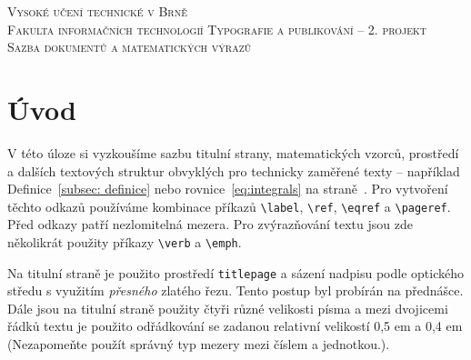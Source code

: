 \documentclass[twocolumn,a4paper,11pt]{article}
\begin{document}
\begin{center}
    \Huge
    \textsc{Vysoké učení technické v Brně \\ Fakulta informačních technologií}
    \textsc{Typografie a publikování -- 2. projekt \\ Sazba dokumentů a matematických výrazů}
\end{center}

{\date{2023} \hfill \author{Roland Schulz (xschul06)} }
\thispagestyle{empty}
\newpage

\section{Úvod}
\label{sec:intro}
V této úloze si vyzkoušíme sazbu titulní strany, matematických vzorců, prostředí a dalších textových struktur obvyklých pro technicky zaměřené texty -- například Definice~\ref{subsec: definice} nebo rovnice~\eqref{eq:integrals} na straně~\pageref{sec: rovnice}. Pro vytvoření těchto odkazů používáme kombinace příkazů \verb|\label|, \verb|\ref|, \verb|\eqref| a \verb|\pageref|. Před odkazy patří nezlomitelná mezera. Pro zvýrazňování textu jsou zde několikrát použity příkazy \verb|\verb| a \verb|\emph|.

Na titulní straně je použito prostředí \verb|titlepage| a sázení nadpisu podle optického středu s využitím \emph{přesného} zlatého řezu. Tento postup byl probírán na přednášce. Dále jsou na titulní straně použity čtyři různé velikosti písma a mezi dvojicemi řádků textu je použito odřádkování se zadanou relativní velikostí 0,5 em a 0,4 em (Nezapomeňte použít správný typ mezery mezi číslem a jednotkou.).
\end{document}
